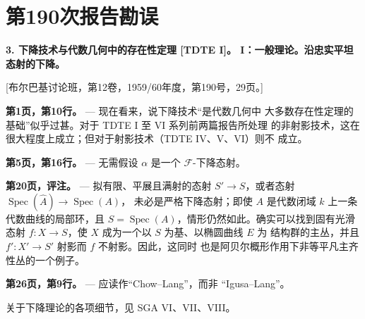 \clearpage
\chapter*{第190次报告勘误}
\setcounter{footnote}{0}

\noindent\textbf{3. 下降技术与代数几何中的存在性定理 [TDTE I]。
I：一般理论。沿忠实平坦态射的下降。}

\begin{center}
[布尔巴基讨论班，第12卷，1959/60年度，第190号，29页。]
\end{center}

\noindent\textbf{第1页，第10行。} --- 现在看来，说下降技术“是代数几何中
大多数存在性定理的基础”似乎过甚。对于 TDTE I 至 VI 系列前两篇报告所处理
的非射影技术，这在很大程度上成立；但对于射影技术（TDTE IV、V、VI）则不
成立。

\noindent\textbf{第5页，第16行。} --- 无需假设 $\alpha$ 是一个
$\mathcal F$-下降态射。

\noindent\textbf{第20页，评注。} --- 拟有限、平展且满射的态射
$S'\longrightarrow S$，或者态射
$\operatorname{Spec}(\widehat A)\longrightarrow\operatorname{Spec}(A)$，
未必是严格下降态射；即使 $A$ 是代数闭域 $k$ 上一条代数曲线的局部环，且
$S=\operatorname{Spec}(A)$，情形仍然如此。确实可以找到固有光滑态射
$f:X\longrightarrow S$，使 $X$ 成为一个以 $S$ 为基、以椭圆曲线 $E$ 为
结构群的主丛，并且 $f':X'\longrightarrow S'$ 射影而 $f$ 不射影。因此，这同时
也是阿贝尔概形作用下非等平凡主齐性丛的一个例子。

\noindent\textbf{第26页，第9行。} --- 应读作“Chow--Lang”，而非
“Igusa--Lang”。

关于下降理论的各项细节，见 SGA VI、VII、VIII。

\par
